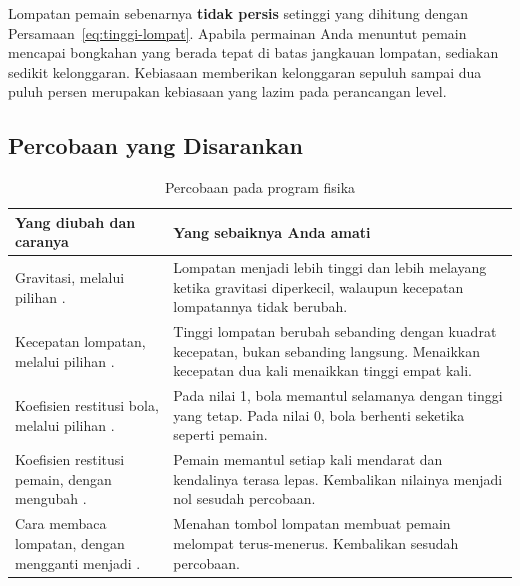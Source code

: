 \begin{catatabox}
Lompatan pemain sebenarnya \textbf{tidak persis} setinggi yang
dihitung dengan Persamaan~\eqref{eq:tinggi-lompat}. Apabila permainan Anda
menuntut pemain mencapai bongkahan yang berada tepat di batas jangkauan
lompatan, sediakan sedikit kelonggaran. Kebiasaan memberikan kelonggaran
sepuluh sampai dua puluh persen merupakan kebiasaan yang lazim pada
perancangan level.
\end{catatabox}

\subsection{Percobaan yang Disarankan}

\begin{table}[htbp]
\centering
\caption{Percobaan pada program fisika}
\label{tab:percobaan-ch06}
{\setlength{\tabcolsep}{4pt}\footnotesize%
\begin{tabularx}{\textwidth}{@{}L{5.6cm} Y@{}}
\toprule
\headrow \textbf{Yang diubah dan caranya} & \textbf{Yang sebaiknya Anda amati} \\
\midrule
Gravitasi, melalui pilihan . &
Lompatan menjadi lebih tinggi dan lebih melayang ketika gravitasi diperkecil,
walaupun kecepatan lompatannya tidak berubah. \\
\addlinespace
Kecepatan lompatan, melalui pilihan . &
Tinggi lompatan berubah sebanding dengan kuadrat kecepatan, bukan sebanding
langsung. Menaikkan kecepatan dua kali menaikkan tinggi empat kali. \\
\addlinespace
Koefisien restitusi bola, melalui pilihan . &
Pada nilai 1, bola memantul selamanya dengan tinggi yang tetap. Pada nilai 0,
bola berhenti seketika seperti pemain. \\
\addlinespace
Koefisien restitusi pemain, dengan mengubah . &
Pemain memantul setiap kali mendarat dan kendalinya terasa lepas. Kembalikan
nilainya menjadi nol sesudah percobaan. \\
\addlinespace
Cara membaca lompatan, dengan mengganti  menjadi
. &
Menahan tombol lompatan membuat pemain melompat terus-menerus. Kembalikan
sesudah percobaan. \\
\bottomrule
\end{tabularx}}
\end{table}
